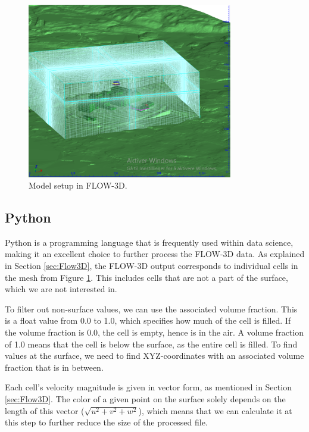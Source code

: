 \documentclass[a4paper,11pt]{extarticle}
\begin{document}
\begin{figure}[H]
  \centering
  \includegraphics[width=0.8\textwidth]{gfx/flow3d_model.png}
  \caption{Model setup in FLOW-3D.}
  \label{fig:Flow3DModel}
\end{figure}

\subsection{Python}\label{sec:Python}
Python \citep{Python} is a programming language that is frequently used within data science, making it an excellent choice to further process the FLOW-3D data. As explained in Section \ref{sec:Flow3D}, the FLOW-3D output corresponds to individual cells in the mesh from Figure \ref{fig:Flow3DModel}. This includes cells that are not a part of the surface, which we are not interested in.

To filter out non-surface values, we can use the associated volume fraction. This is a float value from 0.0 to 1.0, which specifies how much of the cell is filled. If the volume fraction is 0.0, the cell is empty, hence is in the air. A volume fraction of 1.0 means that the cell is below the surface, as the entire cell is filled. To find values at the surface, we need to find XYZ-coordinates with an associated volume fraction that is in between.

Each cell's velocity magnitude is given in vector form, as mentioned in Section \ref{sec:Flow3D}. The color of a given point on the surface solely depends on the length of this vector ($\sqrt{u^2 + v^2 + w^2}$), which means that we can calculate it at this step to further reduce the size of the processed file.
\end{document}
